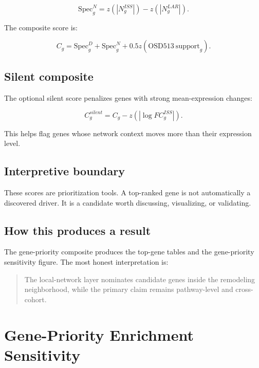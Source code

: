 \documentclass[11pt]{article}
\begin{document}
\begin{equation}
\mathrm{Spec}^{N}_g=z(|N_g^{ISS}|)-z(|N_g^{LAR}|).
\end{equation}

The composite score is:

\begin{equation}
C_g=\mathrm{Spec}^{D}_g+\mathrm{Spec}^{N}_g+0.5z(\mathrm{OSD513\ support}_g).
\end{equation}

\subsection{Silent composite}

The optional silent score penalizes genes with strong mean-expression changes:

\begin{equation}
C_g^{silent}=C_g-z(|\log FC_g^{ISS}|).
\end{equation}

This helps flag genes whose network context moves more than their expression level.

\subsection{Interpretive boundary}

These scores are prioritization tools. A top-ranked gene is not automatically a discovered driver. It is a candidate worth discussing, visualizing, or validating.

\subsection{How this produces a result}

The gene-priority composite produces the top-gene tables and the gene-priority sensitivity figure. The most honest interpretation is:

\begin{quote}
The local-network layer nominates candidate genes inside the remodeling neighborhood, while the primary claim remains pathway-level and cross-cohort.
\end{quote}

\section{Gene-Priority Enrichment Sensitivity}
\end{document}
